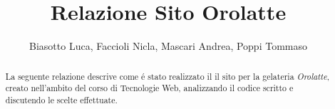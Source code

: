 \documentclass[10 pt]{extarticle}
\title{Relazione Sito Orolatte}
\author{Biasotto Luca, Faccioli Nicla, Mascari Andrea, Poppi Tommaso}
\date{}
\begin{document}
\maketitle
\begin{abstract}
La seguente relazione descrive come \'e stato realizzato il il sito per la gelateria \emph{Orolatte}, creato nell'ambito del corso di Tecnologie Web, analizzando il codice scritto e discutendo le scelte effettuate.
\end{abstract}
\pagebreak
\tableofcontents
\pagebreak

 
 \pagebreak
 
 \pagebreak
 
 \pagebreak
 
\end{document}
